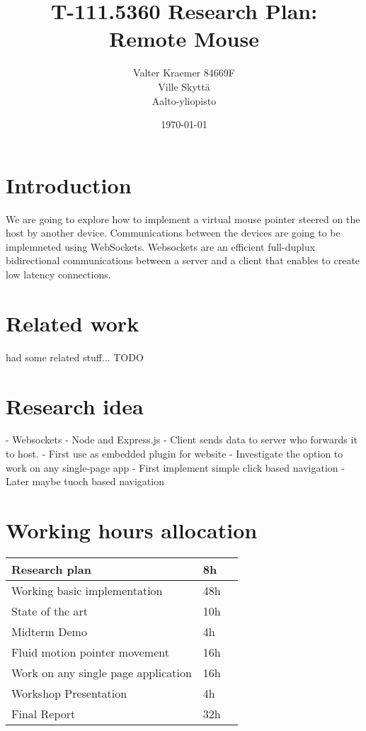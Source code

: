 \documentclass[12pt,a4paper,english,oneside]{article}
\begin{document}
\title{T-111.5360 Research Plan:\\[5mm]
Remote Mouse}

\author{Valter Kraemer 84669F \\
  Ville Skyttä\\
Aalto-yliopisto}

\date{\today}

\maketitle


\section{Introduction}

We are going to explore how to implement a virtual mouse pointer steered on the host by another device. Communications between the devices are going to be implemneted using WebSockets. Websockets are an efficient full-duplux bidirectional communications between a server and a client that enables to create low latency connections.

\section{Related work}

\citet{bassbouss} had some related stuff... TODO

\section{Research idea}

- Websockets
- Node and Express.js
- Client sends data to server who forwards it to host.
- First use as embedded plugin for website
- Investigate the option to work on any single-page app
- First implement simple click based navigation
- Later maybe tuoch based navigation


\section{Working hours allocation}

\begin{tabular}{|p{13mm}|p{13mm}|p{120mm}|}
  \hline
  Research plan                       & 8h    \\ \hline
  Working basic implementation        & 48h   \\ \hline
  State of the art                    & 10h   \\ \hline
  Midterm Demo                        & 4h    \\ \hline
  Fluid motion pointer movement       & 16h   \\ \hline
  Work on any single page application & 16h   \\ \hline
  Workshop Presentation               & 4h    \\ \hline
  Final Report                        & 32h   \\ \hline
\end{tabular}
\end{document}
